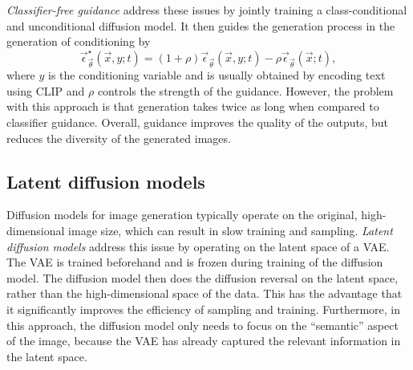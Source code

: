 \textit{Classifier-free guidance} \citep{ho2022classifierfree} address these issues by jointly training a class-conditional and unconditional diffusion model. It then guides the generation process in the generation of conditioning by \[
    \vec{\epsilon}^\star_{\vec{\theta}}(\vec{x}, y; t) = (1 + \rho) \vec{\epsilon}_{\vec{\theta}}(\vec{x}, y; t) - \rho \vec{\epsilon}_{\vec{\theta}}(\vec{x}; t),
\]
where $y$ is the conditioning variable and is usually obtained by encoding text using CLIP and $\rho$
controls the strength of the guidance. However, the problem
with this approach is that generation takes twice as long when compared to classifier guidance.
Overall, guidance improves the quality of the outputs, but reduces the diversity of the generated
images.

\subsection{Latent diffusion models}

Diffusion models for image generation typically operate on the original, high-dimensional image size,
which can result in slow training and sampling. \textit{Latent diffusion models}
\citep{rombach2022highresolution} address this issue by operating on the latent space of a VAE. The
VAE is trained beforehand and is frozen during training of the diffusion model. The diffusion model
then does the diffusion reversal on the latent space, rather than the high-dimensional space of the
data. This has the advantage that it significantly improves the efficiency of sampling and training.
Furthermore, in this approach, the diffusion model only needs to focus on the ``semantic'' aspect of
the image, because the VAE has already captured the relevant information in the latent space.
